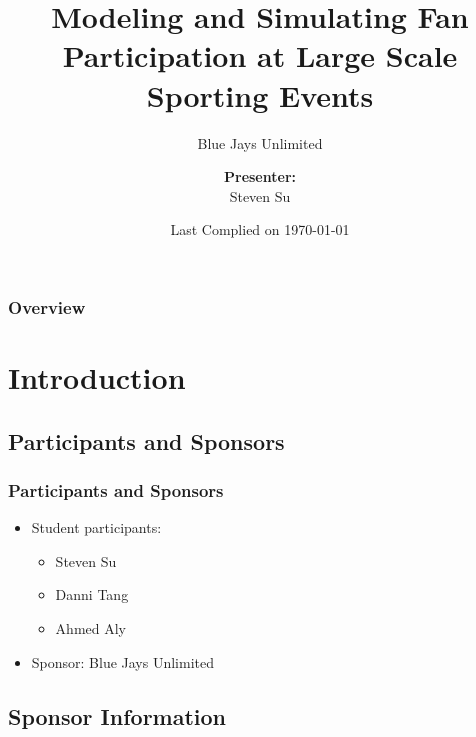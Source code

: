 \documentclass[compress,handout,10pt]{beamer}
\title{{\LARGE Modeling and Simulating Fan Participation at Large Scale Sporting Events\newline} }
\subtitle{{\large Blue Jays Unlimited} }
\author{ 
    {\bf{Presenter:}} \\ 
Steven Su \\ 
    \vspace{5pt}
}
\institute{JHU AMS 550.400 Fall 2012}
\date{Last Complied on \today}
\let\olditem\item
\renewcommand{\item}{\setlength{\itemsep}{0.5\baselineskip}\olditem}
\begin{document}
\begin{frame}[plain]
    \titlepage
\end{frame}

\begin{frame}
    \frametitle{Overview}
    {\small \tableofcontents}
\end{frame}

\section{Introduction}

\subsection{Participants and Sponsors}

\begin{frame}
	\frametitle{Participants and Sponsors}
	\begin {itemize}
		\item Student participants:
			\begin {itemize}
				\item Steven Su
				\item Danni Tang
				\item Ahmed Aly
			\end {itemize}
		\item Sponsor: Blue Jays Unlimited	
	\end {itemize}
\end{frame}

\subsection{Sponsor Information}
\end{document}
